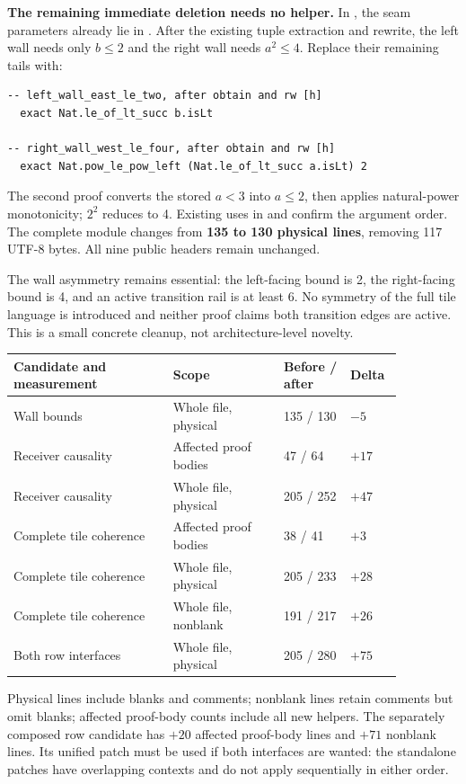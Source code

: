 \textbf{The remaining immediate deletion needs no helper.} In , the seam parameters already lie in . After the existing tuple extraction and rewrite, the left wall needs only $b\leq2$ and the right wall needs $a^2\leq4$. Replace their remaining tails with:
\begin{lstlisting}
-- left_wall_east_le_two, after obtain and rw [h]
  exact Nat.le_of_lt_succ b.isLt

-- right_wall_west_le_four, after obtain and rw [h]
  exact Nat.pow_le_pow_left (Nat.le_of_lt_succ a.isLt) 2
\end{lstlisting}
The second proof converts the stored $a<3$ into $a\leq2$, then applies natural-power monotonicity; $2^2$ reduces to 4. Existing uses in  and  confirm the argument order. The complete module changes from \textbf{135 to 130 physical lines}, removing 117 UTF-8 bytes. All nine public headers remain unchanged.

The wall asymmetry remains essential: the left-facing bound is 2, the right-facing bound is 4, and an active transition rail is at least 6. No symmetry of the full tile language is introduced and neither proof claims both transition edges are active. This is a small concrete cleanup, not architecture-level novelty.

\begin{tabular}{@{}L{0.36\linewidth}L{0.25\linewidth}L{0.15\linewidth}L{0.10\linewidth}@{}}\toprule
Candidate and measurement & Scope & Before / after & Delta\\\midrule
Wall bounds & Whole file, physical & 135 / 130 & $-5$\\[4pt]
Receiver causality & Affected proof bodies & 47 / 64 & $+17$\\[4pt]
Receiver causality & Whole file, physical & 205 / 252 & $+47$\\[4pt]
Complete tile coherence & Affected proof bodies & 38 / 41 & $+3$\\[4pt]
Complete tile coherence & Whole file, physical & 205 / 233 & $+28$\\[4pt]
Complete tile coherence & Whole file, nonblank & 191 / 217 & $+26$\\[4pt]
Both row interfaces & Whole file, physical & 205 / 280 & $+75$\\\bottomrule
\end{tabular}

Physical lines include blanks and comments; nonblank lines retain comments but omit blanks; affected proof-body counts include all new helpers. The separately composed row candidate has $+20$ affected proof-body lines and $+71$ nonblank lines. Its unified patch must be used if both interfaces are wanted: the standalone patches have overlapping contexts and do not apply sequentially in either order.

